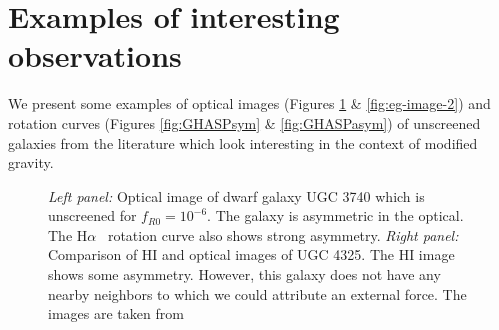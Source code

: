 \documentclass{emulateapj}
\newcommand{\ha}{H$\alpha$}
\begin{document}
\section{Examples of interesting observations}
\label{ap:curves}
We present some examples of optical images (Figures \ref{fig:eg-image-1} \&
\ref{fig:eg-image-2}) and rotation curves (Figures \ref{fig:GHASPsym} \&
\ref{fig:GHASPasym}) of unscreened galaxies from the literature which look
interesting in the context of modified gravity. 


\begin{figure}
\caption{{\it Left panel:} Optical image of dwarf galaxy UGC 3740 which is
unscreened for $f_{R0}=10^{-6}$. The galaxy is asymmetric in the optical. The \ha~
rotation curve also shows strong asymmetry. 
{\it Right panel:} Comparison of HI and optical images of UGC 4325. The HI
image shows some asymmetry. However, this galaxy does not have any nearby neighbors to which we could attribute an external force. The images are taken from \citet{figgs2008,swaters2002b}
\label{fig:eg-image-1}}
\end{figure}
\end{document}
